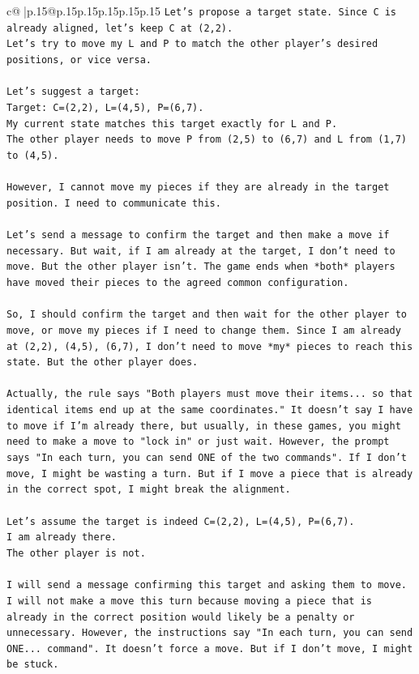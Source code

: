 \documentclass{article}
\begin{document}
{\begin{supertabular}{c@{$\;$}|p{.15\linewidth}@{}p{.15\linewidth}p{.15\linewidth}p{.15\linewidth}p{.15\linewidth}p{.15\linewidth}}
{{{\texttt{Let's propose a target state. Since C is already aligned, let's keep C at (2,2).} \\
\texttt{Let's try to move my L and P to match the other player's desired positions, or vice versa.} \\
\\ 
\texttt{Let's suggest a target:} \\
\texttt{Target: C=(2,2), L=(4,5), P=(6,7).} \\
\texttt{My current state matches this target exactly for L and P.} \\
\texttt{The other player needs to move P from (2,5) to (6,7) and L from (1,7) to (4,5).} \\
\\ 
\texttt{However, I cannot move my pieces if they are already in the target position. I need to communicate this.} \\
\\ 
\texttt{Let's send a message to confirm the target and then make a move if necessary. But wait, if I am already at the target, I don't need to move. But the other player isn't. The game ends when *both* players have moved their pieces to the agreed common configuration.} \\
\\ 
\texttt{So, I should confirm the target and then wait for the other player to move, or move my pieces if I need to change them. Since I am already at (2,2), (4,5), (6,7), I don't need to move *my* pieces to reach this state. But the other player does.} \\
\\ 
\texttt{Actually, the rule says "Both players must move their items... so that identical items end up at the same coordinates." It doesn't say I have to move if I'm already there, but usually, in these games, you might need to make a move to "lock in" or just wait. However, the prompt says "In each turn, you can send ONE of the two commands". If I don't move, I might be wasting a turn. But if I move a piece that is already in the correct spot, I might break the alignment.} \\
\\ 
\texttt{Let's assume the target is indeed C=(2,2), L=(4,5), P=(6,7).} \\
\texttt{I am already there.} \\
\texttt{The other player is not.} \\
\\ 
\texttt{I will send a message confirming this target and asking them to move. I will not make a move this turn because moving a piece that is already in the correct position would likely be a penalty or unnecessary. However, the instructions say "In each turn, you can send ONE... command". It doesn't force a move. But if I don't move, I might be stuck.} \\
}}}
\end{supertabular}}
\end{document}
